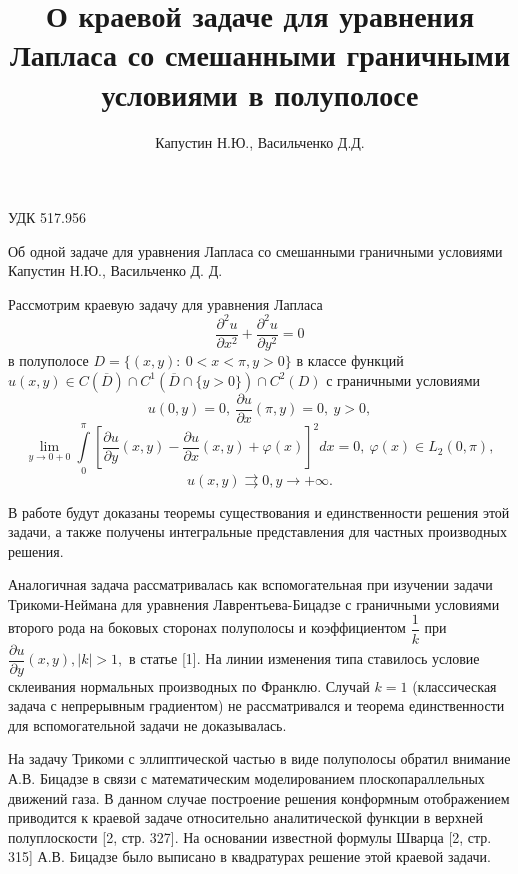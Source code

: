 \documentclass[a4paper, 9pt]{article}
\title{О краевой задаче для уравнения Лапласа со смешанными граничными условиями в полуполосе}
\author{Капустин Н.Ю., Васильченко Д.Д.}
\date{}
\begin{document}
	УДК 517.956
	\begin{center}		
		\LARGE{
		 Об одной задаче для уравнения Лапласа со смешанными граничными условиями
		}
		\newline
		\large{Капустин Н.Ю., Васильченко Д. Д.}
		
	\end{center}
	\par
	Рассмотрим краевую задачу для уравнения Лапласа
	\begin{equation}
		\dfrac{\partial^2 u}{\partial x^2} +\dfrac{\partial^2 u}{\partial y^2} = 0
	\end{equation}
	в полуполосе $D = \{(x,y) :\  0 < x < \pi, y > 0\}$	в классе функций $u(x,y) \in C(\overline{D}) \cap C^1(\overline{D} \cap \{y > 0\}) \cap C^2 (D)$\newline
	с граничными условиями
	\begin{equation}
		u(0, y) = 0, \ \dfrac{\partial u}{\partial x} (\pi, y) = 0, \ y > 0, 
	\end{equation}
	\begin{equation}
		\lim\limits_{y \to 0 + 0} \int\limits_0^\pi \left[\dfrac{\partial u}{\partial y}(x,y) - \dfrac{\partial u}{\partial x}(x,y) + \varphi(x) \right]^2 dx = 0, \ \varphi(x) \in L_2(0,\pi) , 
	\end{equation}
	\begin{equation}
		u(x,y) \rightrightarrows 0, y \to +\infty. 
	\end{equation}
	
	В работе будут доказаны теоремы существования и единственности решения
	этой задачи, а также получены интегральные представления для частных
	производных решения.
	
	Аналогичная задача рассматривалась как вспомогательная при изучении задачи Трикоми-Неймана
	для уравнения Лаврентьева-Бицадзе с граничными условиями второго рода на боковых сторонах
	полуполосы и коэффициентом $\dfrac{1}{k}$ при
	$\dfrac{\partial u}{\partial y}(x,y), \vert k\vert>1, $ в статье [1].
	На линии изменения типа ставилось условие склеивания нормальных производных
	по Франклю. Случай $k=1$ (классическая задача с непрерывным градиентом)
	не рассматривался и теорема единственности для вспомогательной задачи
	не доказывалась.
	
	На задачу Трикоми с эллиптической частью в виде полуполосы обратил внимание
	А.В. Бицадзе в связи с математическим моделированием плоскопараллельных
	движений газа. В данном случае построение решения конформным отображением
	приводится к краевой задаче относительно аналитической функции в верхней
	полуплоскости [2, стр. 327]. На основании известной формулы Шварца [2, стр. 315]
	А.В. Бицадзе было выписано в квадратурах решение этой краевой задачи. 
	
\end{document}
